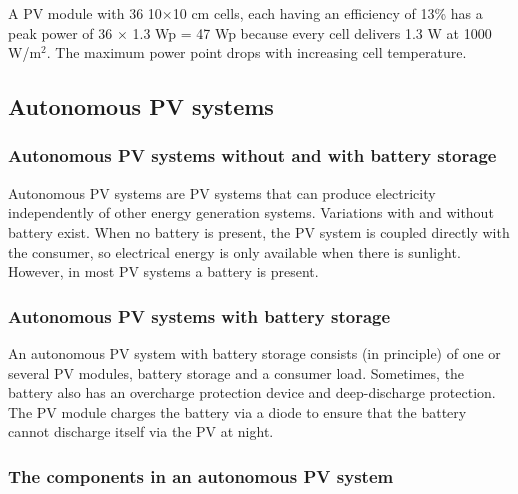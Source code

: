 \documentclass[a4paper,10pt]{article}
\begin{document}
A PV module with 36 10$\times$10 cm cells, each having an efficiency of 13\% has a peak power of 36 $\times$ 1.3 Wp = 47 Wp because every cell delivers 1.3 W at 1000 W/m$^2$. The maximum power point drops with increasing cell temperature.


\subsection{Autonomous PV systems}
\subsubsection{Autonomous PV systems without and with battery storage}
Autonomous PV systems are PV systems that can produce electricity independently of other energy generation systems. Variations with and without battery exist. When no battery is present, the PV system is coupled directly with the consumer, so electrical energy is only available when there is sunlight. However, in most PV systems a battery is present.

\subsubsection{Autonomous PV systems with battery storage}
An autonomous PV system with battery storage consists (in principle) of one or several PV modules, battery storage and a consumer load. Sometimes, the battery also has an overcharge protection device and deep-discharge protection. The PV module charges the battery via a diode to ensure that the battery cannot discharge itself via the PV at night.

\subsubsection{The components in an autonomous PV system}
\end{document}

